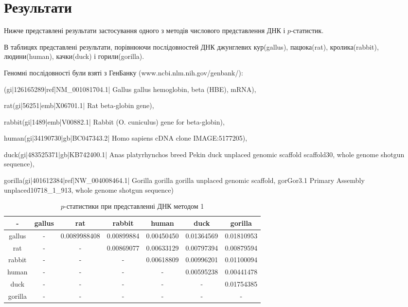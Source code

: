 \documentclass[14pt,a4paper,titlepage]{extarticle}
\begin{document}
\newpage

\section{Результати}
Нижче представлені результати застосування одного з методів числового представлення ДНК і $p$-статистик.\par
В таблицях представлені результати, порівнюючи послідовностей ДНК джунглевих
кур(gallus), пацюка(rat), кролика(rabbit), людини(human), качки(duck) і
горили(gorilla).\par
Геномні послідовності були взяті з ГенБанку (www.ncbi.nlm.nih.gov/genbank/):\par
(gi|126165289|ref|NM\_001081704.1| Gallus gallus hemoglobin, beta (HBE), mRNA),\par
rat(gi|56251|emb|X06701.1| Rat beta-globin gene),\par
rabbit(gi|1489|emb|V00882.1| Rabbit (O. cuniculus) gene for beta-globin),\par
human(gi|34190730|gb|BC047343.2| Homo sapiens cDNA clone IMAGE:5177205),\par
duck(gi|483525371|gb|KB742400.1| Anas platyrhynchos breed Pekin duck unplaced genomic scaffold scaffold30, whole genome shotgun sequence),\par
gorilla(gi|401612384|ref|NW\_004008464.1| Gorilla gorilla gorilla unplaced genomic scaffold, gorGor3.1 Primary Assembly unplaced10718\_1\_913, whole genome shotgun sequence)\par

\newpage
\begin{table}[h!]
\begin{center}
\begin{tabular}{|c|c|c|c|c|c|c|}
\hline
- & gallus & rat & rabbit & human & duck & gorilla \\ \hline
gallus & - & 0.0089988408 & 0.00899884 & 0.00450450 & 0.01364569 & 0.01810953 \\ \hline
rat & - & - & 0.00869077 & 0.00633129 & 0.00797394 & 0.00879594 \\ \hline
rabbit & - & - & - & 0.00618809 & 0.00996201 & 0.01100094 \\ \hline
human & - & - & - & - & 0.00595238 & 0.00441478 \\ \hline
duck & - & - & - & - & - & 0.01754385 \\ \hline
gorilla & - & - & - & - & - & - \\ \hline
\end{tabular}
\end{center}
\caption{$p$-статистики при представленні ДНК методом 1}
\label{table:res1}
\end{table}
\end{document}
